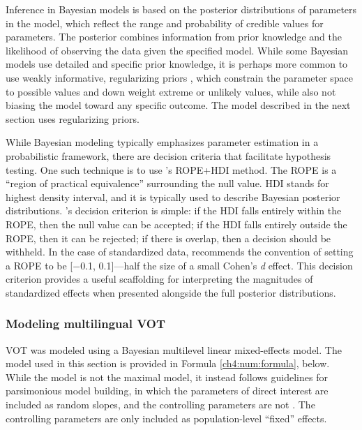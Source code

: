 Inference in Bayesian models is based on the posterior distributions of parameters in the model, which reflect the range and probability of credible values for parameters. The posterior combines information from prior knowledge and the likelihood of observing the data given the specified model. While some Bayesian models use detailed and specific prior knowledge, it is perhaps more common to use weakly informative, regularizing priors \citep{gelman_2017_prior}, which constrain the parameter space to possible values and down weight extreme or unlikely values, while also not biasing the model toward any specific outcome. The model described in the next section uses regularizing priors. 

While Bayesian modeling typically emphasizes parameter estimation in a probabilistic framework, there are decision criteria that facilitate hypothesis testing. One such technique is to use \citeauthor{kruschke_2011_rope}'s \citeyearpar{kruschke_2011_rope} ROPE+HDI method. The ROPE is a ``region of practical equivalence'' surrounding the null value. HDI stands for highest density interval, and it is typically used to describe Bayesian posterior distributions. \citeauthor{kruschke_2011_rope}'s \citeyearpar{kruschke_2011_rope} decision criterion is simple: if the HDI falls entirely within the ROPE, then the null value can be accepted; if the HDI falls entirely outside the ROPE, then it can be rejected; if there is overlap, then a decision should be withheld. In the case of standardized data, \citet{kruschke_2011_rope} recommends the convention of setting a ROPE to be [$-$0.1, 0.1]---half the size of a small Cohen's \textit{d} effect. This decision criterion provides a useful scaffolding for interpreting the magnitudes of standardized effects when presented alongside the full posterior distributions. 

\subsubsection{Modeling multilingual VOT}

VOT was modeled using a Bayesian multilevel linear mixed-effects model. The model used in this section is provided in Formula \ref{ch4:num:formula}, below. While the model is not the maximal model, it instead follows guidelines for parsimonious model building, in which the parameters of direct interest are included as random slopes, and the controlling parameters are not \citep[for more discussion on this topic, see][]{barr_2013_maximal, bates_2018_parsimonious}. The controlling parameters are only included as population-level ``fixed'' effects.

